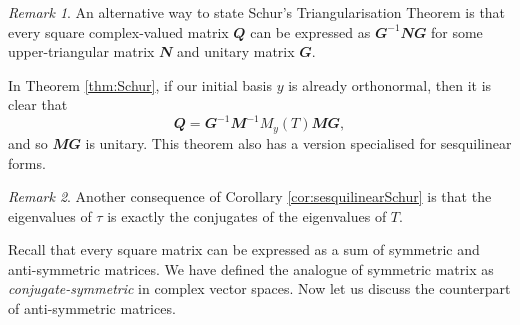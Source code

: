 \documentclass[math]{amznotes}
\makeatletter
\let\save@mathaccent\mathaccent
\newcommand*\if@single[3]{%
  \setbox0\hbox{${\mathaccent"0362{#1}}^H$}%
  \setbox2\hbox{${\mathaccent"0362{\kern0pt#1}}^H$}%
  \ifdim\ht0=\ht2 #3\else #2\fi
  }
\newcommand*\rel@kern[1]{\kern#1\dimexpr\macc@kerna}
\newcommand*\widebar[1]{\@ifnextchar^{{\wide@bar{#1}{0}}}{\wide@bar{#1}{1}}}
\newcommand*\wide@bar[2]{\if@single{#1}{\wide@bar@{#1}{#2}{1}}{\wide@bar@{#1}{#2}{2}}}
\newcommand*\wide@bar@[3]{%
  \begingroup
  \def\mathaccent##1##2{%
    \let\mathaccent\save@mathaccent
    \if#32 \let\macc@nucleus\first@char \fi
    \setbox\z@\hbox{$\macc@style{\macc@nucleus}_{}$}%
    \setbox\tw@\hbox{$\macc@style{\macc@nucleus}{}_{}$}%
    \dimen@\wd\tw@
    \advance\dimen@-\wd\z@
    \divide\dimen@ 3
    \@tempdima\wd\tw@
    \advance\@tempdima-\scriptspace
    \divide\@tempdima 10
    \advance\dimen@-\@tempdima
    \ifdim\dimen@>\z@ \dimen@0pt\fi
    \rel@kern{0.6}\kern-\dimen@
    \if#31
      \overline{\rel@kern{-0.6}\kern\dimen@\macc@nucleus\rel@kern{0.4}\kern\dimen@}%
      \advance\dimen@0.4\dimexpr\macc@kerna
      \let\final@kern#2%
      \ifdim\dimen@<\z@ \let\final@kern1\fi
      \if\final@kern1 \kern-\dimen@\fi
    \else
      \overline{\rel@kern{-0.6}\kern\dimen@#1}%
    \fi
  }%
  \macc@depth\@ne
  \let\math@bgroup\@empty \let\math@egroup\macc@set@skewchar
  \mathsurround\z@ \frozen@everymath{\mathgroup\macc@group\relax}%
  \macc@set@skewchar\relax
  \let\mathaccentV\macc@nested@a
  \if#31
    \macc@nested@a\relax111{#1}%
  \else
    \def\gobble@till@marker##1\endmarker{}%
    \futurelet\first@char\gobble@till@marker#1\endmarker
    \ifcat\noexpand\first@char A\else
      \def\first@char{}%
    \fi
    \macc@nested@a\relax111{\first@char}%
  \fi
  \endgroup
}
\theoremstyle{remark}
\newtheorem*{remark}{Remark}
\makeatother
\begin{document}
    \begin{notebox}
        \begin{remark}
            An alternative way to state Schur's Triangularisation Theorem is that every square complex-valued matrix $\mathbfit{Q}$ can be expressed as $\mathbfit{G}^{-1}\mathbfit{N}\mathbfit{G}$ for some upper-triangular matrix $\mathbfit{N}$ and unitary matrix $\mathbfit{G}$.
        \end{remark}
    \end{notebox}
    In Theorem \ref{thm:Schur}, if our initial basis $y$ is already orthonormal, then it is clear that 
    \begin{equation*}
        \mathbfit{Q} = \mathbfit{G}^{-1}\mathbfit{M}^{-1}M_y(T)\mathbfit{M}\mathbfit{G},
    \end{equation*}
    and so $\mathbfit{M}\mathbfit{G}$ is unitary. This theorem also has a version specialised for sesquilinear forms.
    \begin{notebox}
        \begin{remark}
            Another consequence of Corollary \ref{cor:sesquilinearSchur} is that the eigenvalues of $\tau$ is exactly the conjugates of the eigenvalues of $T$.
        \end{remark}
    \end{notebox}
    Recall that every square matrix can be expressed as a sum of symmetric and anti-symmetric matrices. We have defined the analogue of symmetric matrix as \textit{conjugate-symmetric} in complex vector spaces. Now let us discuss the counterpart of anti-symmetric matrices.
\end{document}
